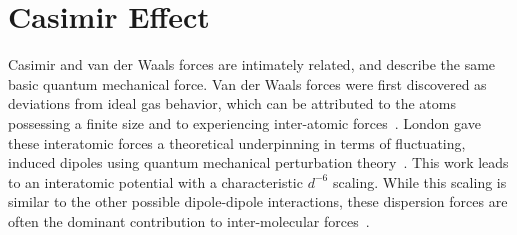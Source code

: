 

\section{Casimir Effect}
\label{sec:casimir}
Casimir and van der Waals forces are intimately related, and describe the same basic quantum mechanical force. 
Van der Waals forces were first discovered as deviations from ideal gas behavior, which can be attributed 
to the atoms possessing a finite size and to experiencing inter-atomic forces~\cite{vanderWaals,Parsegian2006}.
London gave these interatomic forces a theoretical underpinning in terms of fluctuating, induced dipoles using quantum mechanical perturbation
 theory~\cite{London1930}.
  This work leads to an interatomic potential with a characteristic $d^{-6}$ scaling.
While this scaling is similar to the other possible dipole-dipole interactions, these dispersion forces are often the dominant contribution
to inter-molecular forces~\cite{Israelachvili2011}.

